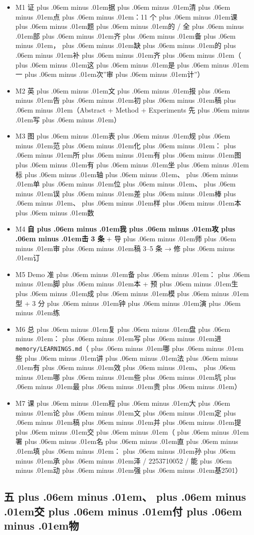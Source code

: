 \documentclass[
]{article}
\newcommand{\passthrough}[1]{#1}
\providecommand{\tightlist}{%
  \setlength{\itemsep}{0pt}\setlength{\parskip}{0pt}}
\def\zh#1{{\zhfont #1}}
\def\sym#1{{\symfont #1}}
\def\codezh#1{{\zhmonofont #1}}
\def\zhglue{\hskip0pt plus .06em minus .01em}
\begin{document}
\begin{itemize}
\tightlist
\item[$\square$]
  M1 \zh{证\zhglue 据\zhglue 清\zhglue 点\zhglue ：}11 \zh{个\zhglue 课\zhglue 题\zhglue 的} \passthrough{\codezh{{\zh{证}}{\zh{据}}/}} \zh{全\zhglue 部\zhglue 齐\zhglue 备\zhglue ，\zhglue 缺\zhglue 的\zhglue 补\zhglue 齐\zhglue （\zhglue 这\zhglue 是\zhglue 一\zhglue 次}''\zh{审\zhglue 计}''\zh{）}
\item[$\square$]
  M2 \zh{英\zhglue 文\zhglue 报\zhglue 告\zhglue 初\zhglue 稿\zhglue （}Abstract + Method + Experiments \zh{先\zhglue 写\zhglue ）}
\item[$\square$]
  M3 \zh{图\zhglue 表\zhglue 规\zhglue 范\zhglue 化\zhglue ：\zhglue 所\zhglue 有\zhglue 图\zhglue 有\zhglue 坐\zhglue 标\zhglue 轴\zhglue 、\zhglue 单\zhglue 位\zhglue 、\zhglue 误\zhglue 差\zhglue 棒\zhglue 、\zhglue 样\zhglue 本\zhglue 数}
\item[$\square$]
  M4 \textbf{\zh{自\zhglue 我\zhglue 攻\zhglue 击} 3 \zh{条}} + \zh{导\zhglue 师\zhglue 审\zhglue 稿} 3--5 \zh{条} \sym{→} \zh{修\zhglue 订}
\item[$\square$]
  M5 Demo \zh{准\zhglue 备\zhglue ：\zhglue 脚\zhglue 本} + \zh{预\zhglue 生\zhglue 成\zhglue 模\zhglue 型} + 3 \zh{分\zhglue 钟\zhglue 演\zhglue 练}
\item[$\square$]
  M6 \zh{总\zhglue 复\zhglue 盘\zhglue ：\zhglue 写\zhglue 进} \passthrough{\lstinline!memory/LEARNINGS.md!}\zh{（\zhglue 哪\zhglue 些\zhglue 讲\zhglue 法\zhglue 有\zhglue 效\zhglue 、\zhglue 哪\zhglue 些\zhglue 坑\zhglue 最\zhglue 贵\zhglue ）}
\item[$\square$]
  M7 \zh{课\zhglue 程\zhglue 大\zhglue 论\zhglue 文\zhglue 定\zhglue 稿\zhglue 并\zhglue 提\zhglue 交\zhglue （\zhglue 署\zhglue 名\zhglue 直\zhglue 填\zhglue ：\zhglue 孙\zhglue 承\zhglue 泽} / 2253710052 / \zh{能\zhglue 动\zhglue 强\zhglue 基}2501\zh{）}
\end{itemize}

\subsection{\zh{五\zhglue 、\zhglue 交\zhglue 付\zhglue 物}}\label{ux4e94ux4ea4ux4ed8ux7269-9}
\end{document}
